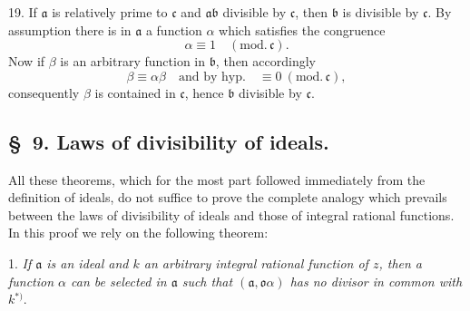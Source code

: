 \documentclass{article}
\begin{document}
19. If $\mathfrak{a}$ is relatively prime to $\mathfrak{c}$ and $\mathfrak{a}\mathfrak{b}$ divisible by $\mathfrak{c}$, then $\mathfrak{b}$ is divisible by $\mathfrak{c}$. By assumption there is in $\mathfrak{a}$ a function $\alpha$ which satisfies the congruence
\[ \alpha \equiv 1 \quad (\text{mod.}\,\mathfrak{c}). \]
Now if $\beta$ is an arbitrary function in $\mathfrak{b}$, then accordingly
\[ \beta \equiv \alpha\beta \quad \text{and by hyp.} \quad \equiv 0 \ (\text{mod.}\,\mathfrak{c}), \]
consequently $\beta$ is contained in $\mathfrak{c}$, hence $\mathfrak{b}$ divisible by $\mathfrak{c}$.

\subsection*{§~9. Laws of divisibility of ideals.}

All these theorems, which for the most part followed immediately from the definition of ideals, do not suffice to prove the complete analogy which prevails between the laws of divisibility of ideals and those of integral rational functions. In this proof we rely on the following theorem:


1. \emph{If $\mathfrak{a}$ is an ideal and $k$ an arbitrary integral rational function of $z$, then a function $\alpha$ can be selected in $\mathfrak{a}$ such that $(\mathfrak{a}, \mathfrak{o}\alpha)$ has no divisor in common with $k$}${}^{*)}$.
\end{document}
